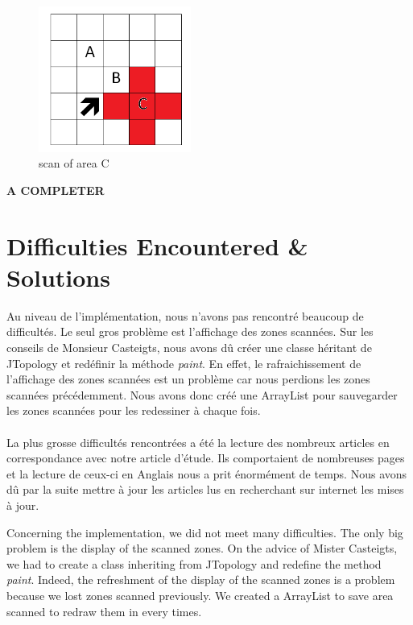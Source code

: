 \begin{figure}[!h]
\center
\includegraphics[width=5cm]{../images/grille_case_2_scan.png}
\caption{scan of area C}
\end{figure}

\textbf{A COMPLETER}



\section{Difficulties Encountered \& Solutions}

Au niveau de l'implémentation, nous n'avons pas rencontré beaucoup de difficultés. Le seul gros problème est l'affichage des zones scannées. Sur les conseils de Monsieur Casteigts, nous avons dû créer une classe héritant de JTopology et redéfinir la méthode \textit{paint}. En effet, le rafraichissement de l'affichage des zones scannées est un problème car nous perdions les zones scannées précédemment. Nous avons donc créé une ArrayList pour sauvegarder les zones scannées pour les redessiner à chaque fois.\\\\

La plus grosse difficultés rencontrées a été la lecture des nombreux articles en correspondance avec notre article d'étude. Ils comportaient de nombreuses pages et la lecture de ceux-ci en Anglais nous a prit énormément de temps. Nous avons dû par la suite mettre à jour les articles lus en recherchant sur internet les mises à jour.

Concerning the implementation, we did not meet many difficulties. The only big problem is the display of the scanned zones. On the advice of Mister Casteigts, we had to create a class inheriting from JTopology and redefine the method \textit{paint}. Indeed, the refreshment of the display of the scanned zones is a problem because we lost zones scanned previously. We created a ArrayList to save area scanned to redraw them in every times. \\\\

